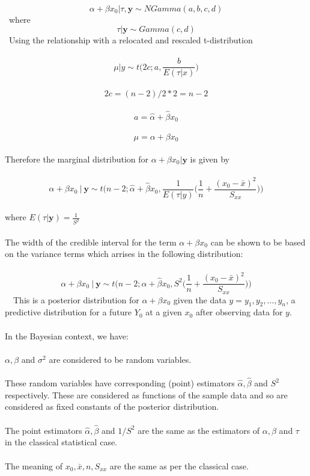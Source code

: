 \documentclass[11pt]{article}   	%
\begin{document}
\
\[ \alpha + \beta x_0 | \tau, \mathbf{y} \sim NGamma(a, b, c, d) \]
\
where \
\
\[ \tau | \mathbf{y} \sim Gamma(c, d) \]
\
Using the relationship with a relocated and rescaled t-distribution \\
\
\[ \mu | y \sim t \bigg( 2c ; a, \frac{b} { E(\tau | x) } \bigg) \]
\
\[ 2c = (n-2)/2 * 2 = n-2 \]
\
\[ a = \hat{\alpha} + \hat{\beta} x_0 \]
\
\[ \mu = \alpha + \beta x_0 \]
\\
Therefore the marginal distribution for $ \alpha + \beta x_0 | \mathbf{y} $ is given by \\
\
\[ \alpha + \beta x_0 \ | \ \mathbf{y} \sim t \Bigg( n-2; \hat{\alpha} + \hat{\beta} x_0, \frac{1}{ E(\tau | y) } \Big( \frac{1}{n} + \frac{ ( x_0 - \bar{x})^2 }{ S_{xx} } \Big) \Bigg) \]
\\
where $ E( \tau | \mathbf{y}) = \frac{1}{S^2} $ \\
\\
The width of the credible interval for the term $ \alpha + \beta x_0 $ can be shown to be based on the variance terms which arrises in the following distribution: \\
\
\[ \alpha + \beta x_0 \ | \ \mathbf{y} \sim t \Bigg( n - 2; \hat{ \alpha } + \hat{ \beta } x_0, S^2 \bigg( \frac{1}{n} + \frac{(x_0 - \bar{x})^2}{S_{xx}} \bigg) \Bigg) \] \
\
This is a posterior distribution for $ \alpha + \beta x_0 $ given the data $ y = y_1, y_2, ... , y_n $, a predictive distribution for a future $ Y_0 $ at a given $ x_0 $ after observing data for $ y $. \\
\\
In the Bayesian context, we have: \\
\\
$ \alpha, \beta $ and $ \sigma^2 $ are considered to be random variables. \\
\\
These random variables have corresponding (point) estimators $ \hat{\alpha}, \hat{\beta} $ and $ S^2 $ respectively. These are considered as functions of the sample data and so are considered as fixed constants of the posterior distribution. \\
\\
The point estimators $ \hat{\alpha}, \hat{\beta} $ and $ 1/S^2 $ are the same as the estimators of $ \alpha, \beta $ and $ \tau $ in the classical statistical case. \\
\\
The meaning of $ x_0, \bar{x}, n, S_{xx} $ are the same as per the classical case. \\
\end{document}

